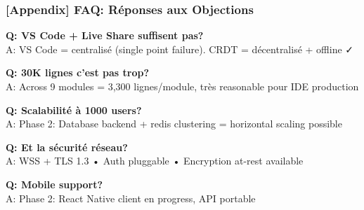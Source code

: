 \documentclass[aspectratio=16:9]{beamer}
\begin{document}
\begin{frame}[fragile]
  \frametitle{[Appendix] FAQ: Réponses aux Objections}
  
  \small
  
  \textbf{Q: VS Code + Live Share suffisent pas?}\\
  A: VS Code = centralisé (single point failure). CRDT = décentralisé + offline ✓
  
  \vspace{0.5cm}
  
  \textbf{Q: 30K lignes c'est pas trop?}\\
  A: Across 9 modules = 3,300 lignes/module, très reasonable pour IDE production
  
  \vspace{0.5cm}
  
  \textbf{Q: Scalabilité à 1000 users?}\\
  A: Phase 2: Database backend + redis clustering = horizontal scaling possible
  
  \vspace{0.5cm}
  
  \textbf{Q: Et la sécurité réseau?}\\
  A: WSS + TLS 1.3 • Auth pluggable • Encryption at-rest available
  
  \vspace{0.5cm}
  
  \textbf{Q: Mobile support?}\\
  A: Phase 2: React Native client en progress, API portable
\end{frame}
\end{document}

